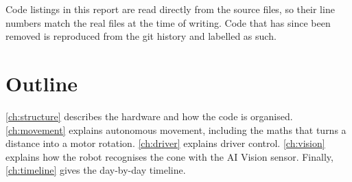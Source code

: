 Code listings in this report are read directly from the source files, so their
line numbers match the real files at the time of writing. Code that has since
been removed is reproduced from the git history and labelled as such.

\section{Outline}

\cref{ch:structure} describes the hardware and how the code is organised.
\cref{ch:movement} explains autonomous movement, including the maths that turns
a distance into a motor rotation. \cref{ch:driver} explains driver control.
\cref{ch:vision} explains how the robot recognises the cone with the AI Vision
sensor. Finally, \cref{ch:timeline} gives the day-by-day timeline.
